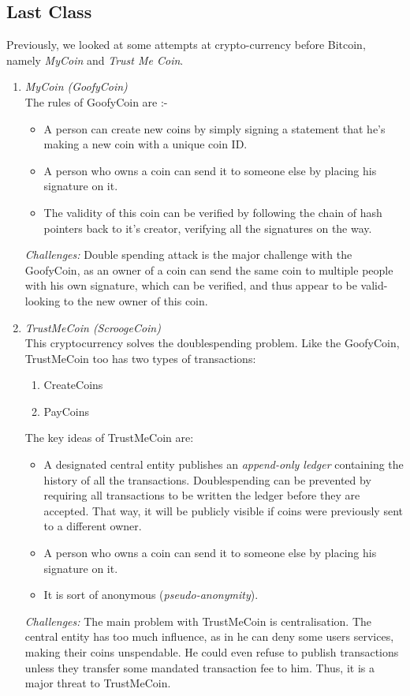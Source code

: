 \documentclass[10pt,a4paper]{article}
\begin{document}
\subsection{Last Class}
Previously, we looked at some attempts at crypto-currency before Bitcoin, namely \emph{MyCoin} and \emph{Trust Me Coin}. 
\begin{enumerate}
    \item {\emph{MyCoin (GoofyCoin)}}\\
    The rules of GoofyCoin are :-
    \begin{itemize}
        \item A person can create new coins by simply signing a statement that he's making a new coin with a unique coin ID.
        \item A person who owns a coin can send it to someone else by placing his signature on it.
        \item The validity of this coin can be verified by following the chain of hash pointers back to it's creator, verifying all the signatures on the way.
\end{itemize}
\emph{Challenges:} Double spending attack is the major challenge with the GoofyCoin, as an owner of a coin can send the same coin to multiple people with his own signature, which can be verified, and thus appear to be valid-looking to the new owner of this coin.
    \item {\em TrustMeCoin (ScroogeCoin)}\\
This cryptocurrency solves the double\-spending problem. Like the GoofyCoin, TrustMeCoin too has two types of transactions:
\begin{enumerate}
\item CreateCoins
\item PayCoins
\end{enumerate}
The key ideas of TrustMeCoin are:
\begin{itemize}
    \item A designated central entity publishes an {\em append-only ledger} containing the history of all the transactions. Double\‐spending can be prevented by requiring all transactions to be written the ledger before they are accepted. That way, it will be publicly visible if coins were previously sent to a different owner.
    
    \item A person who owns a coin can send it to someone else by placing his signature on it.
    
    \item It is sort of anonymous (\emph{pseudo-anonymity}).
\end{itemize}
\emph{Challenges:} The main problem with TrustMeCoin is centralisation. The central entity has too much influence, as in he can deny some users services, making their coins unspendable. He could even refuse to publish transactions unless they transfer some mandated transaction fee
to him. Thus, it is a major threat to TrustMeCoin.
\end{enumerate}
\end{document}
